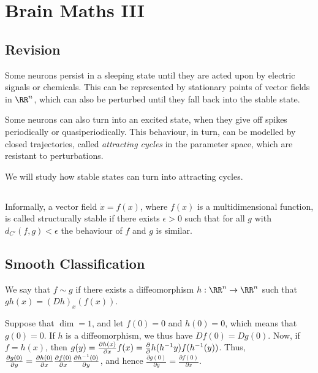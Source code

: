 \documentclass[11pt]{scrartcl}
\begin{document}
  \section{Brain Maths III}

  \subsection{Revision}

  Some neurons persist in a sleeping state until they are acted upon
  by electric signals or chemicals. This can be represented by
  stationary points of vector fields in $\RR^{n}$, which can also be
  perturbed until they fall back into the stable state.

  Some neurons can also turn into an excited state, when they give off
  spikes periodically or quasiperiodically. This behaviour, in turn,
  can be modelled by closed trajectories, called \textit{attracting
    cycles} in the parameter space, which are resistant to
  perturbations.

  We will study how stable states can turn into attracting cycles.

  \subsection{}

  Informally, a vector field $\dot{x} = f(x)$, where $f(x)$ is a
  multidimensional function, is called structurally stable if there
  exists $\epsilon > 0$ such that for all $g$ with
  $d_{C'}(f, g) < \epsilon$ the behaviour of $f$ and $g$ is similar.

  \subsection{Smooth Classification}

  We say that $f\sim g$ if there exists a diffeomorphism
  $h: \RR^{n} \to \RR^{n}$ such that $gh(x) = (Dh)_{x}(f(x))$.

  \begin{example}

    Suppose that $\dim = 1$, and let $f(0) = 0$ and $h(0) = 0$, which
    means that $g(0) = 0$. If $h$ is a diffeomorphism, we thus have
    $Df(0) = Dg(0)$. Now, if $f = h(x)$, then
    $g(y) = \frac{\partial h(x)}{\partial x} \* f(x) = \frac{\partial
    }{\partial}h(h^{-1}y)\*f(h^{-1}(y))$. Thus,
    $\frac{\partial g(0)}{\partial y} = \frac{\partial h(0)}{\partial
      x} \* \frac{\partial f(0)}{\partial x}\* \frac{\partial
      h^{-1}(0)}{\partial y}$, and hence
    $\frac{\partial g(0)}{\partial y} = \frac{\partial f(0)}{\partial
      x}$.

  \end{example}
\end{document}
